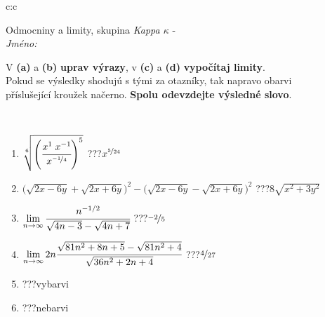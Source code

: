 \documentclass[10pt]{report}
\begin{document}
\newpage
\thispagestyle{empty}
\begin{tabular}{c:c}
\begin{minipage}[c][104.5mm][t]{0.5\linewidth}
\begin{center}
\vspace{7mm}
{\huge Odmocniny a limity, skupina \textit{Kappa $\kappa$} -}\\[5mm]
\textit{Jméno:}\phantom{xxxxxxxxxxxxxxxxxxxxxxxxxxxxxxxxxxxxxxxxxxxxxxxxxxxxxxxxxxxxxxxxx}\\[5mm]
\begin{minipage}{0.95\linewidth}
\begin{center}
V \textbf{(a)} a \textbf{(b)} \textbf{uprav výrazy}, v \textbf{(c)} a \textbf{(d)} \textbf{vypočítaj limity}.\\Pokud se výsledky shodujú s tými za otazníky, tak napravo obarvi\\příslušející kroužek načerno. \textbf{Spolu odevzdejte výsledné slovo}.
\end{center}
\end{minipage}
\\[1mm]
\begin{minipage}{0.79\linewidth}
\begin{center}
\begin{varwidth}{\linewidth}
\begin{enumerate}
\small
\item $\sqrt[6]{\left(\cfrac{x^{1}\;x^{-1}}{x^{\nicefrac{-1}{4}}}\right)^{5}}$\quad \dotfill\; ???\;\dotfill \quad $x^{\nicefrac{5}{24}}$
\item {\footnotesize{\scriptsize$\big(\sqrt{2x-6y}+\sqrt{2x+6y}\big)^2-\big(\sqrt{2x-6y}-\sqrt{2x+6y}\big)^2$}\quad \dotfill\; ???\;\dotfill \quad $8\sqrt{x^2+3y^2}$}
\item $\lim\limits_{n\to\infty}\cfrac{n^{-1/2}}{\sqrt{4n-3}-\sqrt{4n+7}}$\quad \dotfill\; ???\;\dotfill \quad $\nicefrac{-2}{5}$
\item $\lim\limits_{n\to\infty}2n\cfrac{\sqrt{81n^2+8n+5}-\sqrt{81n^2+4}}{\sqrt{36n^2+2n+4}}$\quad \dotfill\; ???\;\dotfill \quad $\nicefrac{4}{27}$
\item \quad \dotfill\; ???\;\dotfill \quad vybarvi
\item \quad \dotfill\; ???\;\dotfill \quad nebarvi
\end{enumerate}
\end{varwidth}
\end{center}
\end{minipage}
\begin{minipage}{0.20\linewidth}

\end{minipage}
\end{center}
\end{minipage}
\end{tabular}
\end{document}
